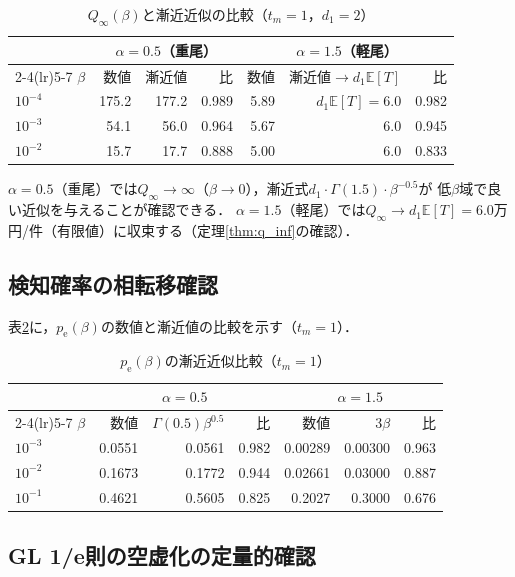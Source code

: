 \documentclass[12pt,a4paper]{article}
\theoremstyle{plain}
\theoremstyle{definition}
\theoremstyle{remark}
\newcommand{\E}{\mathbb{E}}
\newcommand{\pe}{p_{\mathrm{e}}}
\newcommand{\Qinf}{Q_{\infty}}
\begin{document}
\begin{table}[h]
\centering
\caption{$\Qinf(\beta)$と漸近近似の比較（$t_m=1$，$d_1=2$）}
\label{tab:q_inf}
\begin{tabular}{@{}lrrrrrr@{}}
\toprule
 & \multicolumn{3}{c}{$\alpha=0.5$（重尾）} & \multicolumn{3}{c}{$\alpha=1.5$（軽尾）} \\
\cmidrule(lr){2-4}\cmidrule(lr){5-7}
$\beta$ & 数値 & 漸近値 & 比 & 数値 & 漸近値$\to d_1\E[T]$ & 比 \\
\midrule
$10^{-4}$ & 175.2 & 177.2 & 0.989 & 5.89 & $d_1\E[T]=6.0$ & 0.982 \\
$10^{-3}$ & 54.1 & 56.0 & 0.964 & 5.67 & 6.0 & 0.945 \\
$10^{-2}$ & 15.7 & 17.7 & 0.888 & 5.00 & 6.0 & 0.833 \\
\bottomrule
\end{tabular}
\end{table}

$\alpha=0.5$（重尾）では$\Qinf\to\infty$（$\beta\to0$），漸近式$d_1\cdot\Gamma(1.5)\cdot\beta^{-0.5}$が
低$\beta$域で良い近似を与えることが確認できる．
$\alpha=1.5$（軽尾）では$\Qinf\to d_1\E[T]=6.0$万円/件（有限値）に収束する（定理\ref{thm:q_inf}の確認）．

\subsection{検知確率の相転移確認}

表\ref{tab:pe_phase}に，$\pe(\beta)$の数値と漸近値の比較を示す（$t_m=1$）．

\begin{table}[h]
\centering
\caption{$\pe(\beta)$の漸近近似比較（$t_m=1$）}
\label{tab:pe_phase}
\begin{tabular}{@{}lrrrrrr@{}}
\toprule
 & \multicolumn{3}{c}{$\alpha=0.5$} & \multicolumn{3}{c}{$\alpha=1.5$} \\
\cmidrule(lr){2-4}\cmidrule(lr){5-7}
$\beta$ & 数値 & $\Gamma(0.5)\beta^{0.5}$ & 比 & 数値 & $3\beta$ & 比 \\
\midrule
$10^{-3}$ & 0.0551 & 0.0561 & 0.982 & 0.00289 & 0.00300 & 0.963 \\
$10^{-2}$ & 0.1673 & 0.1772 & 0.944 & 0.02661 & 0.03000 & 0.887 \\
$10^{-1}$ & 0.4621 & 0.5605 & 0.825 & 0.2027 & 0.3000 & 0.676 \\
\bottomrule
\end{tabular}
\end{table}

\subsection{GL 1/e則の空虚化の定量的確認}
\end{document}
